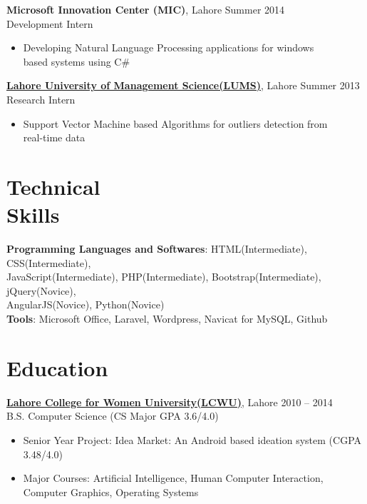 \documentclass[margin,line]{res}
\begin{document}
\begin{resume}
\begin{itemize}
 \end{itemize}
{\bf Microsoft Innovation Center (MIC)}, Lahore \hfill 
Summer 2014\\
 Development Intern
\begin{itemize} \itemsep -2pt  %
 \item Developing Natural Language Processing applications for windows\\based systems using C\# 
 \end{itemize}
  \href{https://lums.edu.pk/}{\bf Lahore University of Management Science(LUMS)}, Lahore \hfill Summer 2013
\\Research Intern
\begin{itemize} \itemsep -2pt  %
 \item Support Vector Machine based Algorithms for outliers detection from\\real-time data 
 \end{itemize}


\section{Technical \\Skills}
{\bf Programming Languages and Softwares}: HTML(Intermediate), CSS(Intermediate),\\  JavaScript(Intermediate), PHP(Intermediate), Bootstrap(Intermediate), jQuery(Novice), \\AngularJS(Novice), Python(Novice)
\\{\bf Tools}: Microsoft Office, Laravel, Wordpress, Navicat for MySQL, Github


\section{Education} 
\href{http://www.lcwu.edu.pk/}{\bf Lahore College for Women University(LCWU)}, Lahore \hfill 2010 -- 2014\\ B.S. Computer Science \hfill(CS Major GPA 3.6/4.0)
\begin{itemize} \itemsep -2pt  %
 \item Senior Year Project: Idea Market: An Android based ideation system \hfill(CGPA 3.48/4.0)
 \item  Major Courses: Artificial Intelligence, Human Computer Interaction,\\ Computer Graphics, Operating Systems 
 \end{itemize}


\end{resume}
\end{document}

